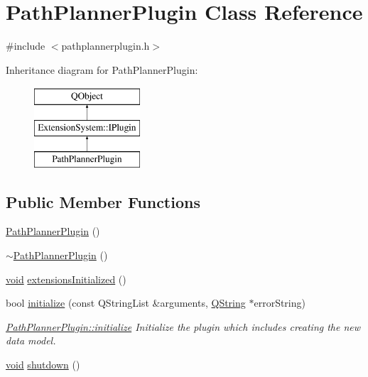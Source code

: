 \hypertarget{class_path_planner_plugin}{\section{Path\-Planner\-Plugin Class Reference}
\label{class_path_planner_plugin}
}


{\ttfamily \#include $<$pathplannerplugin.\-h$>$}

Inheritance diagram for Path\-Planner\-Plugin\-:\begin{figure}[H]
\begin{center}
\leavevmode
\includegraphics[height=3.000000cm]{class_path_planner_plugin}
\end{center}
\end{figure}
\subsection*{Public Member Functions}
\begin{DoxyCompactItemize}
\item 
\hyperlink{group___path_planner_gadget_plugin_ga754f3760ad2179865dabf983f1bcfb04}{Path\-Planner\-Plugin} ()
\item 
\hyperlink{group___path_planner_gadget_plugin_gabb5e520f0952f6c023ae86b5bb903197}{$\sim$\-Path\-Planner\-Plugin} ()
\item 
\hyperlink{group___u_a_v_objects_plugin_ga444cf2ff3f0ecbe028adce838d373f5c}{void} \hyperlink{group___path_planner_gadget_plugin_ga21fa3c1e21372d56ddf70b6fe5973897}{extensions\-Initialized} ()
\item 
bool \hyperlink{group___path_planner_gadget_plugin_ga08ada1f91b2f37c282cbabdcdb7af6d8}{initialize} (const Q\-String\-List \&arguments, \hyperlink{group___u_a_v_objects_plugin_gab9d252f49c333c94a72f97ce3105a32d}{Q\-String} $\ast$error\-String)
\begin{DoxyCompactList}\small\item\em \hyperlink{group___path_planner_gadget_plugin_ga08ada1f91b2f37c282cbabdcdb7af6d8}{Path\-Planner\-Plugin\-::initialize} Initialize the plugin which includes creating the new data model. \end{DoxyCompactList}\item 
\hyperlink{group___u_a_v_objects_plugin_ga444cf2ff3f0ecbe028adce838d373f5c}{void} \hyperlink{group___path_planner_gadget_plugin_ga86bbf998d72f805f00576608baf627ba}{shutdown} ()
\end{DoxyCompactItemize}


